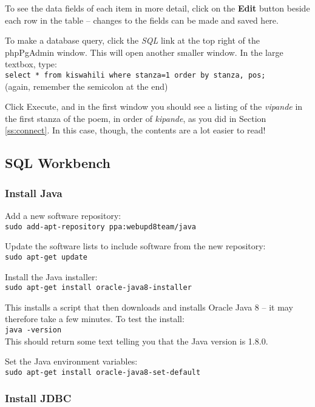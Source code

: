 \documentclass[a4paper,10pt]{article}
\begin{document}
To see the data fields of each item in more detail, click on the \textbf{Edit} button beside each row in the table -- changes to the fields can be made and saved here.

To make a database query, click the \textit{SQL} link at the top right of the phpPgAdmin window.  This will open another smaller window.  In the large textbox, type:\\
\verb|select * from kiswahili where stanza=1 order by stanza, pos;|\\
(again, remember the semicolon at the end)

Click Execute, and in the first window you should see a listing of the \textit{vipande} in the first stanza of the poem, in order of \textit{kipande}, as you did in Section \ref{ss:connect}.  In this case, though, the contents are a lot easier to read!


\subsection{SQL Workbench}

\subsubsection{Install Java}

Add a new software repository:\\
\verb|sudo add-apt-repository ppa:webupd8team/java|

Update the software lists to include software from the new repository:\\
\verb|sudo apt-get update|

Install the Java installer:\\
\verb|sudo apt-get install oracle-java8-installer|

This installs a script that then downloads and installs Oracle Java 8 -- it may therefore take a few minutes.  To test the install:\\
\verb|java -version|\\
This should return some text telling you that the Java version is 1.8.0.

Set the Java environment variables:\\
\verb|sudo apt-get install oracle-java8-set-default|

\subsubsection{Install JDBC}
\label{ss:jdbc}
\end{document}
